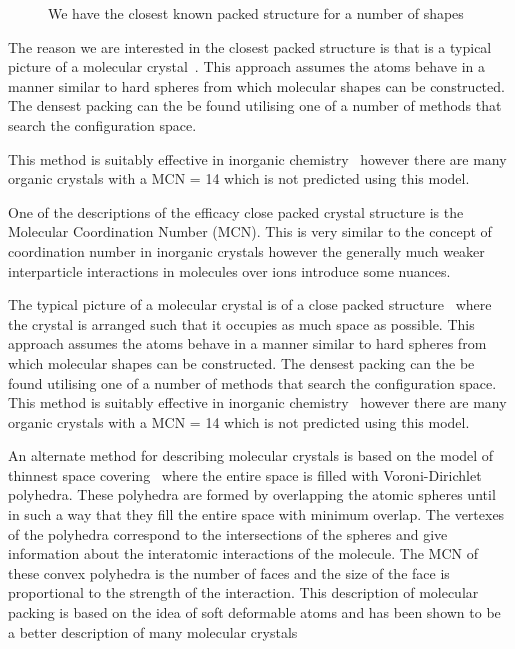 \begin{figure}
    \caption{We have the closest known packed structure for a number of shapes}
    \label{fig:hcp}
\end{figure}


The reason we are interested in the closest packed structure is that is a typical picture of a molecular crystal~\cite{kitaigorodskii:73}. This approach assumes the atoms behave in a manner similar to hard spheres from which molecular shapes can be constructed. The densest packing can the be found utilising one of a number of methods that search the configuration space. 

This method is suitably effective in inorganic chemistry~\cite{wells:84} however there are many organic crystals with a MCN = 14 which is not predicted using this model.

One of the descriptions of the efficacy close packed crystal structure is the Molecular Coordination Number (MCN). This is very similar to the concept of coordination number in inorganic crystals however the generally much weaker interparticle interactions in molecules over ions introduce some nuances.

The typical picture of a molecular crystal is of a close packed structure~\cite{kitaigorodskii:73} where the crystal is arranged such that it occupies as much space as possible. This approach assumes the atoms behave in a manner similar to hard spheres from which molecular shapes can be constructed. The densest packing can the be found utilising one of a number of methods that search the configuration space. This method is suitably effective in inorganic chemistry~\cite{wells:84} however there are many organic crystals with a MCN = 14 which is not predicted using this model.

An alternate method for describing molecular crystals is based on the model of thinnest space covering~\cite{blatov:95} where the entire space is filled with Voroni-Dirichlet polyhedra. These polyhedra are formed by overlapping the atomic spheres until in such a way that they fill the entire space with minimum overlap. The vertexes of the polyhedra correspond to the intersections of the spheres and give information about the interatomic interactions of the molecule. The MCN of these convex polyhedra is the number of faces and the size of the face is proportional to the strength of the interaction. This description of molecular packing is based on the idea of soft deformable atoms and has been shown to be a better description of many molecular crystals~\cite{blatov:97,peresypkina:99,peresypkina:00}

